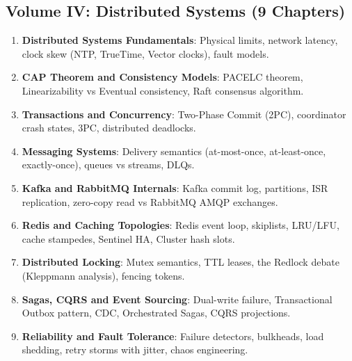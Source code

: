 \documentclass[11pt,oneside]{book}
\begin{document}
\subsection*{Volume IV: Distributed Systems (9 Chapters)}
\begin{enumerate}[leftmargin=18pt]
  \item \textbf{Distributed Systems Fundamentals}: Physical limits, network latency, clock skew (NTP, TrueTime, Vector clocks), fault models.
  \item \textbf{CAP Theorem and Consistency Models}: PACELC theorem, Linearizability vs Eventual consistency, Raft consensus algorithm.
  \item \textbf{Transactions and Concurrency}: Two-Phase Commit (2PC), coordinator crash states, 3PC, distributed deadlocks.
  \item \textbf{Messaging Systems}: Delivery semantics (at-most-once, at-least-once, exactly-once), queues vs streams, DLQs.
  \item \textbf{Kafka and RabbitMQ Internals}: Kafka commit log, partitions, ISR replication, zero-copy read vs RabbitMQ AMQP exchanges.
  \item \textbf{Redis and Caching Topologies}: Redis event loop, skiplists, LRU/LFU, cache stampedes, Sentinel HA, Cluster hash slots.
  \item \textbf{Distributed Locking}: Mutex semantics, TTL leases, the Redlock debate (Kleppmann analysis), fencing tokens.
  \item \textbf{Sagas, CQRS and Event Sourcing}: Dual-write failure, Transactional Outbox pattern, CDC, Orchestrated Sagas, CQRS projections.
  \item \textbf{Reliability and Fault Tolerance}: Failure detectors, bulkheads, load shedding, retry storms with jitter, chaos engineering.
\end{enumerate}
\end{document}
